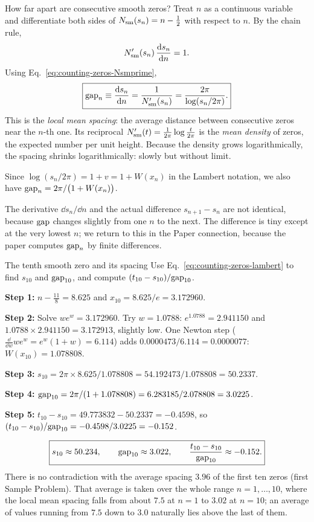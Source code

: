 How far apart are consecutive smooth zeros? Treat $n$ as a continuous variable and differentiate both sides of $N_{\mathrm{sm}}(s_n)=n-\tfrac12$ with respect to $n$. By the chain rule,
\begin{equation}
N_{\mathrm{sm}}'(s_n)\,\frac{\mathrm{d} s_n}{\mathrm{d} n}=1.
\end{equation}
Using Eq.~\eqref{eq:counting-zeros-Nsmprime},
\begin{equation}
\boxed{\mathrm{gap}_n\equiv\frac{\mathrm{d} s_n}{\mathrm{d} n}=\frac{1}{N_{\mathrm{sm}}'(s_n)}=\frac{2\pi}{\log(s_n/2\pi)}.}
\label{eq:counting-zeros-gap}
\end{equation}
This is the \emph{local mean spacing}: the average distance between consecutive zeros near the $n$-th one. Its reciprocal $N_{\mathrm{sm}}'(t)=\frac1{2\pi}\log\frac t{2\pi}$ is the \emph{mean density} of zeros, the expected number per unit height. Because the density grows logarithmically, the spacing shrinks logarithmically: slowly but without limit.

Since $\log(s_n/2\pi)=1+v=1+W(x_n)$ in the Lambert notation, we also have $\mathrm{gap}_n=2\pi/\bigl(1+W(x_n)\bigr)$.

The derivative $\dd s_n/\dd n$ and the actual difference $s_{n+1}-s_n$ are not identical, because $\mathrm{gap}$ changes slightly from one $n$ to the next. The difference is tiny except at the very lowest $n$; we return to this in the Paper connection, because the paper computes $\mathrm{gap}_n$ by finite differences.

\begin{sample}{The tenth smooth zero and its spacing}
Use Eq.~\eqref{eq:counting-zeros-lambert} to find $s_{10}$ and $\mathrm{gap}_{10}$, and compute $(t_{10}-s_{10})/\mathrm{gap}_{10}$.

\textbf{Step 1:} $n-\tfrac{11}{8}=8.625$ and $x_{10}=8.625/e=3.172960$.

\textbf{Step 2:} Solve $we^w=3.172960$. Try $w=1.0788$: $e^{1.0788}=2.941150$ and $1.0788\times2.941150=3.172913$, slightly low. One Newton step ($\frac{\dd}{\dd w}we^w=e^w(1+w)=6.114$) adds $0.0000473/6.114=0.0000077$: $W(x_{10})=1.078808$.

\textbf{Step 3:} $s_{10}=2\pi\times8.625/1.078808=54.192473/1.078808=50.2337$.

\textbf{Step 4:} $\mathrm{gap}_{10}=2\pi/(1+1.078808)=6.283185/2.078808=3.0225$.

\textbf{Step 5:} $t_{10}-s_{10}=49.773832-50.2337=-0.4598$, so $(t_{10}-s_{10})/\mathrm{gap}_{10}=-0.4598/3.0225=-0.152$.

\[
\boxed{s_{10}\approx50.234,\qquad\mathrm{gap}_{10}\approx3.022,\qquad\frac{t_{10}-s_{10}}{\mathrm{gap}_{10}}\approx-0.152.}
\]
There is no contradiction with the average spacing $3.96$ of the first ten zeros (first Sample Problem). That average is taken over the whole range $n=1,\dots,10$, where the local mean spacing falls from about $7.5$ at $n=1$ to $3.02$ at $n=10$; an average of values running from $7.5$ down to $3.0$ naturally lies above the last of them.
\end{sample}

